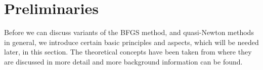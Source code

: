 \chapter{Preliminaries}

Before we can discuss variants of the BFGS method, and quasi-Newton methods in general, we introduce certain basic principles and aspects, which will be needed later, in this section. The theoretical concepts have been taken from \cite{BerkolaikoKuchment:2013} where they are discussed in more detail and more background information can be found.




